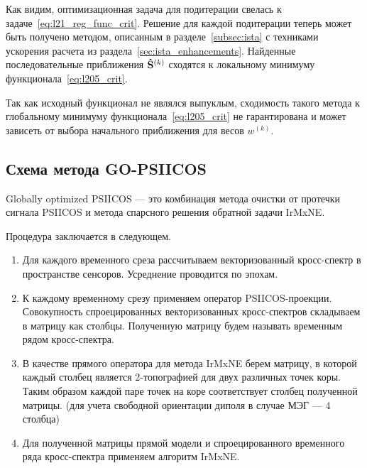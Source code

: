 Как видим, оптимизационная задача для подитерации свелась к
задаче~\ref{eq:l21_reg_func_crit}.  Решение для каждой подитерации теперь может
быть получено методом, описанным в разделе~\ref{subsec:ista} с техниками
ускорения расчета из раздела~\ref{sec:ista_enhancements}.  Найденные
последовательные приближения $\mathbf{\hat{S}}^{(k)}$ сходятся к локальному
минимуму функционала~\ref{eq:l205_crit}.

Так как исходный функционал не являлся выпуклым, сходимость такого метода к глобальному минимуму
функционала~\ref{eq:l205_crit} не гарантирована и может зависеть от выбора начального приближения
для весов $w^{(k)}$.

\subsection{Схема метода GO-PSIICOS}
Globally optimized PSIICOS --- это комбинация метода очистки от
протечки сигнала PSIICOS и метода спарсного решения обратной задачи
IrMxNE.\@

Процедура заключается в следующем.

\begin{enumerate}
    \item Для каждого временного среза рассчитываем векторизованный кросс-спектр 
        в пространстве сенсоров. Усреднение проводится по эпохам.
    \item К каждому временному срезу применяем оператор PSIICOS-проекции. Совокупность 
        спроецированных векторизованных кросс-спектров складываем в матрицу как столбцы. 
        Полученную матрицу будем называть временным рядом кросс-спектра.
    \item В качестве прямого оператора для метода IrMxNE берем матрицу, в которой
        каждый столбец является 2-топографией для двух различных точек коры. Таким
        образом каждой паре точек на коре соответствует столбец полученной матрицы. 
        (для учета свободной ориентации диполя в случае МЭГ --- 4 столбца)
    \item Для полученной матрицы прямой модели и спроецированного
        временного ряда кросс-спектра применяем алгоритм IrMxNE.
\end{enumerate}

